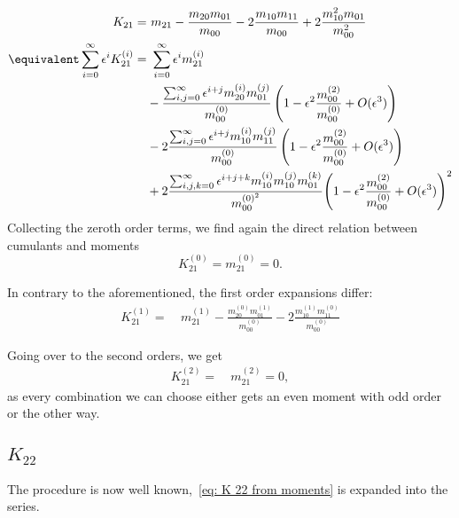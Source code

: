 \begin{equation}
  \begin{aligned}
    K_{21} = &\ m_{21} - \frac{m_{20}m_{01}}{m_{00}}
         - 2\frac{m_{10}m_{11}}{m_{00}} + 2\frac{m_{10}^2 m_{01}}{m_{00}^2}
    \\
    \equivalent
    \sum_{i=0}^\infty \epsilon^i K_{21}^{(i)}
     = &\ \sum_{i=0}^\infty \epsilon^i m_{21}^{(i)}
    \\ &
    - \frac{\sum_{i,j=0}^\infty \epsilon^{i+j} m_{20}^{(i)} m_{01}^{(j)}}{m_{00}^{(0)}}
      \left(1 - \epsilon^2 \frac{m_{00}^{(2)}}{m_{00}^{(0)}}  + O(\epsilon^3)\right)
    \\ &
     - 2\frac{\sum_{i,j=0}^\infty \epsilon^{i+j} m_{10}^{(i)} m_{11}^{(j)}}{m_{00}^{(0)}}
      \left(1 - \epsilon^2 \frac{m_{00}^{(2)}}{m_{00}^{(0)}}  + O(\epsilon^3)\right)
     \\ &
     +
        2 \frac{\sum_{i,j,k=0}^\infty \epsilon^{i+j+k} m_{10}^{(i)} m_{10}^{(j)} m_{01}^{(k)}}{m_{00}^{{(0)}^2}}
        {
          \left(1 - \epsilon^2 \frac{m_{00}^{(2)}}{m_{00}^{(0)}}  + O(\epsilon^3)\right)
        }^2
   \end{aligned}
\end{equation}
Collecting the zeroth order terms, we find again the direct relation between cumulants and moments
\begin{equation}
  K_{21}^{(0)} = m_{21}^{(0)} = 0.
\end{equation}

In contrary to the aforementioned, the first order expansions differ:
\begin{equation}
  \begin{aligned}
    K_{21}^{(1)} = &\ m_{21}^{(1)}
    - \frac{m_{20}^{(0)} m_{01}^{(1)}}{m_{00}^{(0)}}
    - 2\frac{m_{10}^{(1)} m_{11}^{(0)}}{m_{00}^{(0)}}
  \end{aligned}
\end{equation}

Going over to the second orders, we get
\begin{equation}
  \begin{aligned}
    K_{21}^{(2)} = &\ m_{21}^{(2)} = 0,
  \end{aligned}
\end{equation}
as every combination we can choose either gets an even moment with odd order or the other way.

\subsection{\texorpdfstring{$K_{22}$}{K 22}}
\label{sub: K 22}
The procedure is now well known,~\eqref{eq: K 22 from moments} is expanded into the series.


